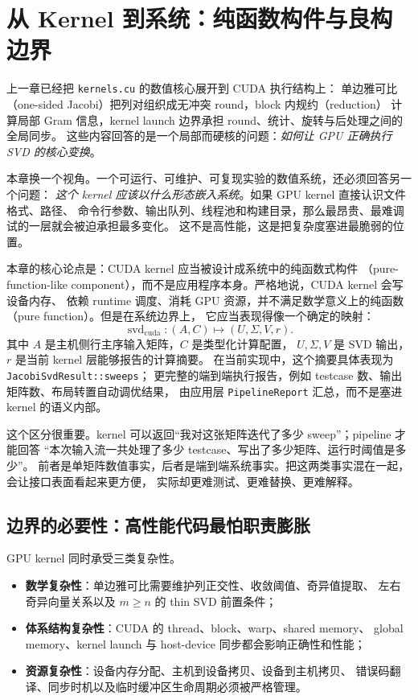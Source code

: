 \section{从 Kernel 到系统：纯函数构件与良构边界}

上一章已经把 \texttt{kernels.cu} 的数值核心展开到 CUDA 执行结构上：
单边雅可比（one-sided Jacobi）把列对组织成无冲突 round，block 内规约（reduction）
计算局部 Gram 信息，kernel launch 边界承担 round、统计、旋转与后处理之间的全局同步。
这些内容回答的是一个局部而硬核的问题：\emph{如何让 GPU 正确执行 SVD 的核心变换}。

本章换一个视角。一个可运行、可维护、可复现实验的数值系统，还必须回答另一个问题：
\emph{这个 kernel 应该以什么形态嵌入系统}。如果 GPU kernel 直接认识文件格式、路径、
命令行参数、输出队列、线程池和构建目录，那么最昂贵、最难调试的一层就会被迫承担最多变化。
这不是高性能，这是把复杂度塞进最脆弱的位置。

本章的核心论点是：CUDA kernel 应当被设计成系统中的纯函数式构件
（pure-function-like component），而不是应用程序本身。严格地说，CUDA kernel 会写设备内存、
依赖 runtime 调度、消耗 GPU 资源，并不满足数学意义上的纯函数（pure function）。但是在系统边界上，
它应当表现得像一个确定的映射：
\[
    \operatorname{svd}_{\mathrm{cuda}}:
    (A,C)
    \longmapsto
    (U,\Sigma,V,r).
\]
其中 \(A\) 是主机侧行主序输入矩阵，\(C\) 是类型化计算配置，
\(U,\Sigma,V\) 是 SVD 输出，\(r\) 是当前 kernel 层能够报告的计算摘要。
在当前实现中，这个摘要具体表现为 \texttt{JacobiSvdResult::sweeps}；
更完整的端到端执行报告，例如 testcase 数、输出矩阵数、布局转置自动调优结果，
由应用层 \texttt{PipelineReport} 汇总，而不是塞进 kernel 的语义内部。

这个区分很重要。kernel 可以返回“我对这张矩阵迭代了多少 sweep”；pipeline 才能回答
“本次输入流一共处理了多少 testcase、写出了多少矩阵、运行时阈值是多少”。
前者是单矩阵数值事实，后者是端到端系统事实。把这两类事实混在一起，会让接口表面看起来更方便，
实际却更难测试、更难替换、更难解释。

\subsection{边界的必要性：高性能代码最怕职责膨胀}

GPU kernel 同时承受三类复杂性。

\begin{itemize}
    \item \textbf{数学复杂性}：单边雅可比需要维护列正交性、收敛阈值、奇异值提取、
          左右奇异向量关系以及 \(m\ge n\) 的 thin SVD 前置条件；
    \item \textbf{体系结构复杂性}：CUDA 的 thread、block、warp、shared memory、
          global memory、kernel launch 与 host-device 同步都会影响正确性和性能；
    \item \textbf{资源复杂性}：设备内存分配、主机到设备拷贝、设备到主机拷贝、
          错误码翻译、同步时机以及临时缓冲区生命周期必须被严格管理。
\end{itemize}

